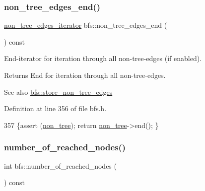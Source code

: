 \subsubsection{\texorpdfstring{non\+\_\+tree\+\_\+edges\+\_\+end()}{non\_tree\_edges\_end()}}
{\footnotesize\ttfamily \mbox{\hyperlink{classbfs_a89ec32919076618d9eef18990fef543f}{non\+\_\+tree\+\_\+edges\+\_\+iterator}} bfs\+::non\+\_\+tree\+\_\+edges\+\_\+end (\begin{DoxyParamCaption}{ }\end{DoxyParamCaption}) const\hspace{0.3cm}{\ttfamily [inline]}}



End-\/iterator for iteration through all non-\/tree-\/edges (if enabled). 

\begin{DoxyReturn}{Returns}
End for iteration through all non-\/tree-\/edges. 
\end{DoxyReturn}
\begin{DoxySeeAlso}{See also}
\mbox{\hyperlink{classbfs_a7de47b820fb9532f497660f767c9457f}{bfs\+::store\+\_\+non\+\_\+tree\+\_\+edges}} 
\end{DoxySeeAlso}


Definition at line 356 of file bfs.\+h.


\begin{DoxyCode}
357     \{assert (\mbox{\hyperlink{classbfs_a056b2131db11e62eb8f41c8dcc117d2e}{non\_tree}}); \textcolor{keywordflow}{return} \mbox{\hyperlink{classbfs_a056b2131db11e62eb8f41c8dcc117d2e}{non\_tree}}->end(); \}
\end{DoxyCode}
\mbox{\label{classbfs_abb971551139ed87e6c78062275301c1b}} 
\subsubsection{\texorpdfstring{number\+\_\+of\+\_\+reached\+\_\+nodes()}{number\_of\_reached\_nodes()}}
{\footnotesize\ttfamily int bfs\+::number\+\_\+of\+\_\+reached\+\_\+nodes (\begin{DoxyParamCaption}{ }\end{DoxyParamCaption}) const\hspace{0.3cm}{\ttfamily [inline]}}



